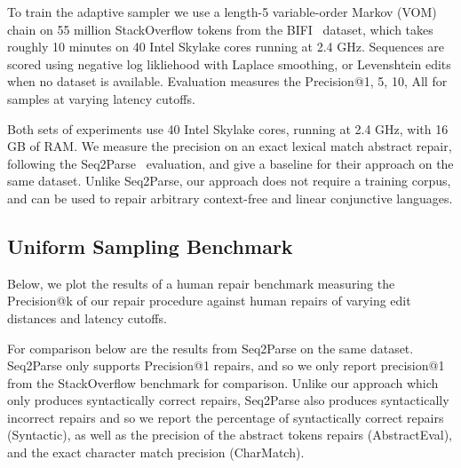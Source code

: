 \documentclass[sigplan,review,anonymous,acmsmall]{acmart}\settopmatter{printfolios=false,printccs=false,printacmref=false}
\begin{document}
To train the adaptive sampler we use a length-5 variable-order Markov (VOM) chain on 55 million StackOverflow tokens from the BIFI~\cite{yasunaga2021break} dataset, which takes roughly 10 minutes on 40 Intel Skylake cores running at 2.4 GHz. Sequences are scored using negative log likliehood with Laplace smoothing, or Levenshtein edits when no dataset is available. Evaluation measures the Precision@{1, 5, 10, All} for samples at varying latency cutoffs.

Both sets of experiments use 40 Intel Skylake cores, running at 2.4 GHz, with 16 GB of RAM. We measure the precision on an exact lexical match abstract repair, following the Seq2Parse~\cite{sakkas2022seq2parse} evaluation, and give a baseline for their approach on the same dataset. Unlike Seq2Parse, our approach does not require a training corpus, and can be used to repair arbitrary context-free and linear conjunctive languages.

\subsection{Uniform Sampling Benchmark}\label{sec:human}

Below, we plot the results of a human repair benchmark measuring the Precision@k of our repair procedure against human repairs of varying edit distances and latency cutoffs.%

\begin{figure}[H]
\resizebox{.3\textwidth}{!}{}
\resizebox{.3\textwidth}{!}{}
\resizebox{.3\textwidth}{!}{}
\end{figure}

For comparison below are the results from Seq2Parse on the same dataset. Seq2Parse only supports Precision@1 repairs, and so we only report precision@1 from the StackOverflow benchmark for comparison. Unlike our approach which only produces syntactically correct repairs, Seq2Parse also produces syntactically incorrect repairs and so we report the percentage of syntactically correct repairs (Syntactic), as well as the precision of the abstract tokens repairs (AbstractEval), and the exact character match precision (CharMatch).
\end{document}
